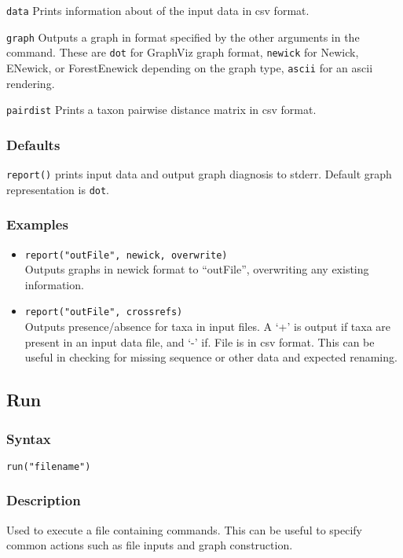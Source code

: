 \documentclass[11pt]{article}
\begin{document}
				\smallskip
				\noindent \texttt{data} Prints information about of the input data in csv format.
				
				\smallskip
				\noindent \texttt{graph} Outputs a graph in format specified by the other arguments in the command.  These are \texttt{dot} for GraphViz graph format,
				\texttt{newick} for Newick, ENewick, or ForestEnewick depending on the graph type, \texttt{ascii} for an ascii rendering.  
				
				\smallskip
				\noindent \texttt{pairdist} Prints a taxon pairwise distance matrix in csv format.   
				
		\subsubsection{Defaults}
				\texttt{report()} prints input data and output graph diagnosis  to stderr.  Default graph representation is \texttt{dot}.
		\subsubsection{Examples}
				\begin{itemize}
					\item{\texttt{report("outFile", newick, overwrite)}\\ Outputs graphs in newick format to ``outFile'', overwriting any existing information.}
					\item{\texttt{report("outFile", crossrefs)}\\ Outputs presence/absence for taxa in input files.  A `+' is output  if taxa are present in an input data file, 
					and `-' if. File is in csv format.  This can be useful in checking for missing sequence or other data and expected renaming.}
				\end{itemize}
			
	\subsection{Run}
		\subsubsection{Syntax}
				\texttt{run("filename")}
		\subsubsection{Description}
			Used to execute a file containing commands.  This can be useful to specify common actions such
			as file inputs and graph construction. 
\end{document}

